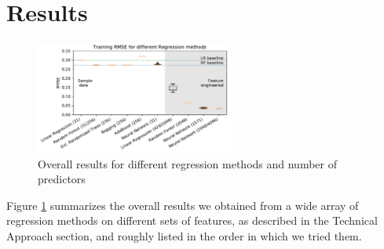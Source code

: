 \documentclass[11pt]{article}
\begin{document}
\section{Results}

\begin{figure}
\centering
\includegraphics[width=0.58\textwidth]{Results_AC.pdf}
\caption{Overall results for different regression methods and number of predictors}
\label{fig:results}
\end{figure}

Figure \ref{fig:results} summarizes the overall results we obtained from a wide array of regression methods on different sets of features, as described in the Technical Approach section, and roughly listed in the order in which we tried them.

\end{document}

